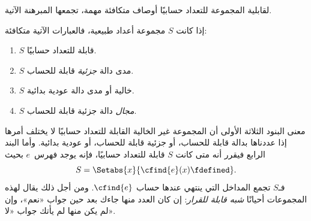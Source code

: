 \documentclass[../../../include/open-logic-section]{subfiles}
\begin{document}


لقابلية المجموعة للتعداد حسابيًا أوصاف متكافئة مهمة، تجمعها
المبرهنة الآتية.

\begin{thm}
إذا كانت $S$ مجموعة أعداد طبيعية، فالعبارات الآتية متكافئة:
\begin{enumerate}
\item{} $S$ قابلة للتعداد حسابيًا.
\item{} $S$ مدى دالة \emph{جزئية} قابلة للحساب.
\item{} $S$ خالية أو مدى دالة عودية بدائية.
\item{} $S$ \emph{مجال} دالة جزئية قابلة للحساب.
\end{enumerate}
\end{thm}

\begin{explain}
معنى البنود الثلاثة الأولى أن المجموعة غير
الخالية القابلة للتعداد حسابيًا لا يختلف أمرها إذا عددناها بدالة قابلة للحساب، أو جزئية
قابلة للحساب، أو عودية بدائية. وأما البند الرابع فيقرر أنه متى كانت
$S$ قابلة للتعداد حسابيًا، فإنه يوجد فهرس~$e$ بحيث
\[
S = \Setabs{x}{\cfind{e}(x) \fdefined}.
\]
فـ$S$ تجمع المداخل التي ينتهي عندها حساب
$\cfind{e}$. ومن أجل ذلك يقال لهذه المجموعات أحيانًا
\emph{شبه قابلة للقرار}: إن كان العدد منها جاءك بعد حين جواب
«نعم»، وإن لم يكن منها لم يأتك جواب «لا».{}
\end{explain}
\end{document}
